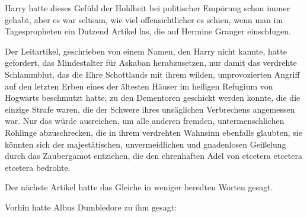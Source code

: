 Harry hatte dieses Gefühl der Hohlheit bei politischer Empörung schon immer gehabt, aber es war seltsam, wie viel offensichtlicher es schien, wenn man im Tagespropheten ein Dutzend Artikel las, die auf Hermine Granger einschlugen.

Der Leitartikel, geschrieben von einem Namen, den Harry nicht kannte, hatte gefordert, das Mindestalter für Askaban herabzusetzen, nur damit das verdrehte Schlammblut, das die Ehre Schottlands mit ihrem wilden, unprovozierten Angriff auf den letzten Erben eines der ältesten Häuser im heiligen Refugium von Hogwarts beschmutzt hatte, zu den Dementoren geschickt werden konnte, die die einzige Strafe waren, die der Schwere ihres unsäglichen Verbrechens angemessen war. Nur das würde ausreichen, um alle anderen fremden, untermenschlichen Rohlinge abzuschrecken, die in ihrem verdrehten Wahnsinn ebenfalls glaubten, sie könnten sich der majestätischen, unvermeidlichen und gnadenlosen Geißelung durch das Zaubergamot entziehen, die den ehrenhaften Adel von etcetera etcetera etcetera bedrohte.

Der nächste Artikel hatte das Gleiche in weniger beredten Worten gesagt.

Vorhin hatte Albus Dumbledore zu ihm gesagt:


